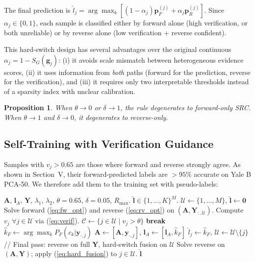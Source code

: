 \documentclass[10pt,comsoc]{IEEEtran}
\newtheorem{proposition}{Proposition}
\begin{document}
The final prediction is $\hat{l}_j = \arg\max_k [(1-\alpha_j)\mathbf{p}_F^{(j)} + \alpha_j\mathbf{p}_R^{(j)}]$. Since $\alpha_j \in \{0,1\}$, each sample is classified either by forward alone (high verification, or both unreliable) or by reverse alone (low verification + reverse confident).

This hard-switch design has several advantages over the original continuous $\alpha_j = 1 - S_G(\mathbf{g}_j)$: (i) it avoids scale mismatch between heterogeneous evidence scores, (ii) it uses information from \emph{both} paths (forward for the prediction, reverse for the verification), and (iii) it requires only two interpretable thresholds instead of a sparsity index with unclear calibration.

\begin{proposition}
When $\theta \to 0$ or $\delta \to 1$, the rule degenerates to forward-only SRC. When $\theta \to 1$ and $\delta \to 0$, it degenerates to reverse-only.
\end{proposition}

\subsection{Self-Training with Verification Guidance}

Samples with $v_j > 0.65$ are those where forward and reverse strongly agree. As shown in Section~V, their forward-predicted labels are $>95\%$ accurate on Yale B PCA-50. We therefore add them to the training set with pseudo-labels:

\begin{algorithm}[t]
\caption{Verification-Guided Self-Training DP-GSR}
\label{alg:main}
\begin{algorithmic}[1]
\REQUIRE $\mathbf{A}$, $\mathbf{l}_A$, $\mathbf{Y}$, $\lambda_1$, $\lambda_2$, $\theta=0.65$, $\delta=0.05$, $R_{\max}$.
\ENSURE $\hat{\mathbf{l}} \in \{1,\dots,K\}^M$.
\STATE $\mathcal{U} \leftarrow \{1,\dots,M\}$, $\hat{\mathbf{l}} \leftarrow \mathbf{0}$
    \STATE Solve forward (\ref{eq:fw_opt}) and reverse (\ref{eq:rv_opt}) on $(\mathbf{A}, \mathbf{Y}_{:,\mathcal{U}})$.
    \STATE Compute $v_j$ $\forall j\in\mathcal{U}$ via (\ref{eq:verif}).
    \STATE $\mathcal{C} \leftarrow \{j \in \mathcal{U} \mid v_j > \theta\}$
     \STATE \textbf{break} \ENDIF
        \STATE $\hat{k}_F \leftarrow \arg\max_k P_F(c_k|\mathbf{y}_{\cdot,j})$
        \STATE $\mathbf{A} \leftarrow [\mathbf{A}, \mathbf{y}_{\cdot,j}]$, $\mathbf{l}_A \leftarrow [\mathbf{l}_A, \hat{k}_F]$
        \STATE $\hat{l}_j \leftarrow \hat{k}_F$, $\mathcal{U} \leftarrow \mathcal{U} \setminus \{j\}$
    \ENDFOR
\ENDFOR
\STATE // Final pass: reverse on full $\mathbf{Y}$, hard-switch fusion on $\mathcal{U}$
\STATE Solve reverse on $(\mathbf{A}, \mathbf{Y})$; apply (\ref{eq:hard_fusion}) to $j\in\mathcal{U}$.
\RETURN $\hat{\mathbf{l}}$
\end{algorithmic}
\end{algorithm}
\end{document}
